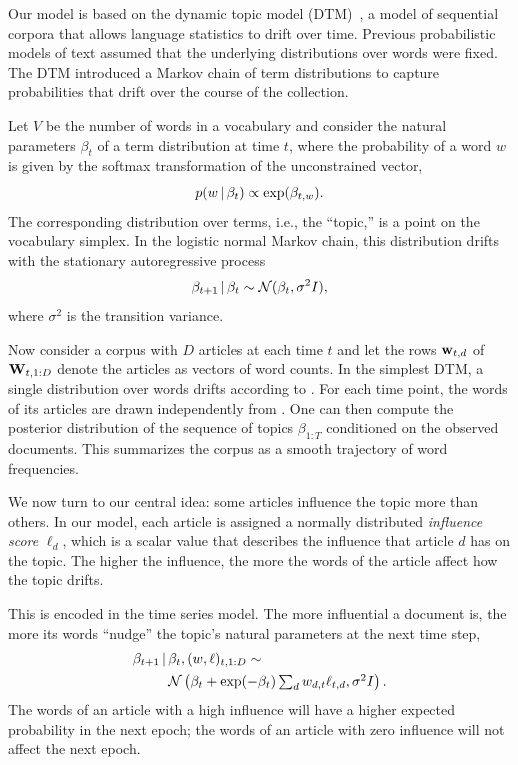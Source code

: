 Our model is based on the dynamic topic model (DTM)~\cite{blei:2006},
a model of sequential corpora that allows language statistics to drift
over time.  Previous probabilistic models of text assumed that the
underlying distributions over words were fixed. The DTM introduced a
Markov chain of term distributions to capture probabilities that drift
over the course of the collection.

Let $V$ be the number of words in a vocabulary and consider the
natural parameters $\beta_t$ of a term distribution at time $t$, where
the probability of a word $w$ is given by the softmax transformation
of the unconstrained vector,
\begin{equation}
  \label{eq:softmax}
  p(w \, | \, \beta_{t}) \propto \exp(\beta_{t,w}).
\end{equation}
The corresponding distribution over terms, i.e., the ``topic,'' is a
point on the vocabulary simplex.  In the logistic normal Markov chain,
this distribution drifts with the stationary autoregressive process
\begin{equation}
  \label{eq:logistic-normal}
  \beta_{t+1} \, | \, \beta_t \sim \mathcal{N}(\beta_{t}, \sigma^2 I),
\end{equation}
where $\sigma^2$ is the transition variance.

Now consider a corpus with $D$ articles at each time $t$ and let the
rows $\textbf{w}_{t,d}$ of $\textbf{W}_{t,1:D}$ denote the articles as vectors of word
counts.  In the simplest DTM, a single distribution over words drifts
according to .  For each time point, the words
of its articles are drawn independently from .  One can
then compute the posterior distribution of the sequence of topics
$\beta_{1:T}$ conditioned on the observed documents.  This summarizes
the corpus as a smooth trajectory of word frequencies.

We now turn to our central idea: some articles influence the topic
more than others.  In our model, each article is assigned a normally
distributed \textit{influence score} $\ell_d$, which is a scalar value
that describes the influence that article $d$ has on the topic.  The
higher the influence, the more the words of the article affect how the
topic drifts.

This is encoded in the time series model.  The more influential a
document is, the more its words ``nudge'' the topic's natural
parameters at the next time step,
\begin{equation}
  \begin{split}
    \label{eq:logistic-normal-influence}
    \beta_{t+1} \, | \, & \beta_t, (w, \ell)_{t,1:D} \sim \\
    & \mathcal{N}\left(
      \beta_{t} +
      \exp(-\beta_t) \textstyle \sum_d w_{d,t} \ell_{t,d},
      \sigma^2 I
    \right).
  \end{split}
\end{equation}
The words of an article with a high influence will have a higher
expected probability in the next epoch; the words of an article
with zero influence will not affect the next epoch.

